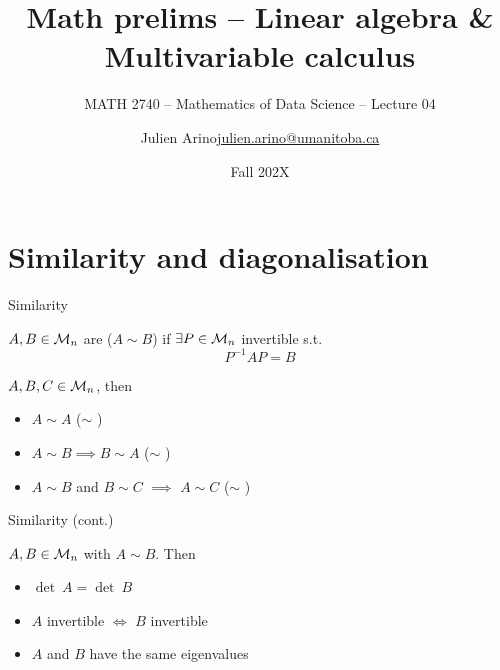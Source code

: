\documentclass[aspectratio=169]{beamer}\usepackage[]{graphicx}\usepackage[]{xcolor}
\subtitle{MATH 2740 -- Mathematics of Data Science -- Lecture 04}
\author{\texorpdfstring{Julien Arino\newline\url{julien.arino@umanitoba.ca}}{Julien Arino}}
\institute{Department of Mathematics @ University of Manitoba}
\date{Fall 202X}
\title{Math prelims -- Linear algebra \& Multivariable calculus}
\begin{document}



\section{Similarity and diagonalisation}

\begin{frame}{Similarity}
\begin{definition}[Similarity]
$A,B\in\mathcal{M}_n$ are  ($A\sim B$) if $\exists P\in\mathcal{M}_n$ invertible s.t.
\[
P^{-1}AP=B
\]
\end{definition}
\begin{theorem}
$A,B,C\in\mathcal{M}_n$, then
\begin{itemize}
	\item $A\sim A$ \hfill ($\sim$ )
	\item $A\sim B\implies B\sim A$ \hfill ($\sim$ )
	\item $A\sim B$ and $B\sim C$ $\implies$ $A\sim C$ \hfill ($\sim$ )
\end{itemize}
\end{theorem}
\end{frame}

\begin{frame}{Similarity (cont.)}
\begin{theorem}
$A,B\in\mathcal{M}_n$ with $A\sim B$. Then
\begin{itemize}
	\item $\det\ A=\det\ B$
	\item $A$ invertible $\iff$ $B$ invertible
	\item $A$ and $B$ have the same eigenvalues
\end{itemize}
\end{theorem}
\end{frame}
\end{document}
